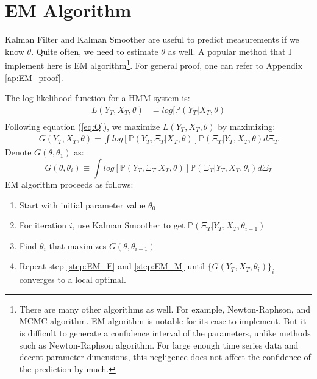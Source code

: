 \documentclass[12pt]{article}
\newenvironment{boenumerate}
    {\begin{enumerate}\renewcommand\labelenumi{\textbf\theenumi}}
    {\end{enumerate}}
\numberwithin{equation}{section}
\begin{document}
\section{EM Algorithm} \label{sec:EM}
Kalman Filter and Kalman Smoother are useful to predict measurements if we know $\theta$. Quite often, we need to estimate $\theta$ as well. A popular method that I implement here is EM algorithm\footnote{There are many other algorithms as well. For example, Newton-Raphson, and MCMC algorithm. EM algorithm is notable for its ease to implement. But it is difficult to generate a confidence interval of the parameters, unlike methods such as Newton-Raphson algorithm. For large enough time series data and decent parameter dimensions, this negligence does not affect the confidence of the prediction by much.}. For general proof, one can refer to Appendix \ref{ap:EM_proof}.

The log likelihood function for a HMM system is:
\begin{align*}
    L(Y_T,X_T, \theta) &= log[\mathbb{P}(Y_T|X_T,\theta) \\
\end{align*}
Following equation (\ref{eq:Q}), we maximize $L(Y_T,X_T,\theta)$ by maximizing: 
\begin{align*}
    G(Y_T,X_T,\theta) = \int log[\mathbb{P}(Y_T,\Xi_T|X_T,\theta)]\mathbb{P}(\Xi_T|Y_T,X_T,\theta)d\Xi_T 
\end{align*}
Denote $G(\theta,\theta_1)$ as: 
\[
    G(\theta,\theta_i) \equiv \int log[\mathbb{P}(Y_T,\Xi_T|X_T,\theta)]\mathbb{P}(\Xi_T|Y_T,X_T,\theta_i)d\Xi_T
\]
EM algorithm proceeds as follows:
\begin{boenumerate}
    \item Start with initial parameter value $\theta_0$
    \item \label{step:EM_E} For iteration $i$, use Kalman Smoother to get $\mathbb{P}(\Xi_T|Y_T,X_T,\theta_{i-1})$
    \item \label{step:EM_M} Find $\theta_{i}$ that maximizes $G(\theta,\theta_{i-1})$    
    \item Repeat step \ref{step:EM_E} and \ref{step:EM_M} until $\{G(Y_T,X_T,\theta_i)\}_i$ converges to a local optimal.
\end{boenumerate}
\end{document}
